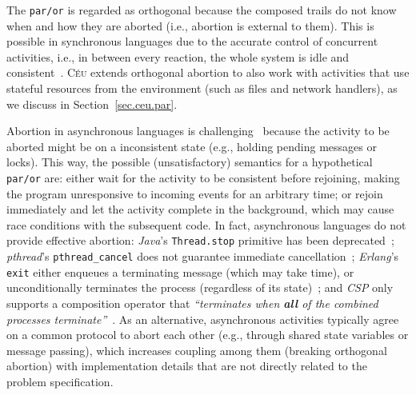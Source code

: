 \documentclass{sigplanconf}
\newcommand{\CEU}{\textsc{C\'{e}u}\xspace}
\newcommand{\code}[1] {{\small{\texttt{#1}}}}
\newcommand{\1}{\;}
\newcommand{\2}{\;\;}
\newcommand{\3}{\;\;\;}
\newcommand{\5}{\;\;\;\;\;}
\begin{document}
The \code{par/or} is regarded as orthogonal because the composed trails do not 
know when and how they are aborted (i.e., abortion is external to them).
%
This is possible in synchronous languages due to the accurate control of 
concurrent activities, i.e., in between every reaction, the whole system is 
idle and consistent~\cite{esterel.preemption}.
%
\CEU extends orthogonal abortion to also work with activities that use stateful 
resources from the environment (such as files and network handlers), as we 
discuss in Section~\ref{sec.ceu.par}.


Abortion in asynchronous languages is challenging~\cite{esterel.preemption} 
because the activity to be aborted might be on a inconsistent state (e.g., 
holding pending messages or locks).
%
This way, the possible (unsatisfactory) semantics for a hypothetical 
\code{par/or} are:
either wait for the activity to be consistent before rejoining, making the 
program unresponsive to incoming events for an arbitrary time;
or rejoin immediately and let the activity complete in the background, which 
may cause race conditions with the subsequent code.
%
%
In fact, asynchronous languages do not provide effective abortion:
\emph{Java}'s \code{Thread.stop} primitive has been 
deprecated~\cite{sync_async.threadsstop};
\emph{pthread}'s \code{pthread\_cancel} does not guarantee immediate 
cancellation~\cite{sync_async.pthreadsstop};
\emph{Erlang}'s \code{exit} either enqueues a terminating message (which may 
take time), or unconditionally terminates the process (regardless of its 
state)~\cite{sync_async.erlangstop};
and \emph{CSP} only supports a composition operator that \emph{``terminates 
when \textbf{all} of the combined processes terminate''}~\cite{async.csp}.
%
As an alternative, asynchronous activities typically agree on a common protocol 
to abort each other (e.g., through shared state variables or message passing), 
which increases coupling among them (breaking orthogonal abortion) with 
implementation details that are not directly related to the problem 
specification.
\end{document}
